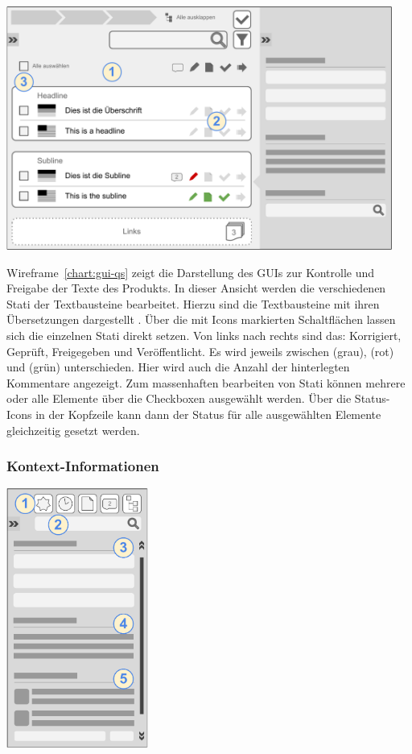 \begin{center}
\includegraphics[width=0.95\textwidth]{media/GUIFreigabe.pdf}
\label{chart:gui-qs}
\end{center}

Wireframe~\ref{chart:gui-qs} zeigt die Darstellung des GUIs zur Kontrolle und Freigabe der Texte des Produkts. In dieser Ansicht werden die verschiedenen Stati der Textbausteine bearbeitet. Hierzu sind die Textbausteine mit ihren Übersetzungen dargestellt . Über die mit Icons markierten Schaltflächen  lassen sich die einzelnen Stati direkt setzen. Von links nach rechts sind das: Korrigiert, Geprüft, Freigegeben und Veröffentlicht. Es wird jeweils zwischen  (grau),  (rot) und  (grün) unterschieden. Hier wird auch die Anzahl der hinterlegten Kommentare angezeigt. Zum massenhaften bearbeiten von Stati können mehrere oder alle Elemente über die Checkboxen  ausgewählt werden. Über die Status-Icons in der Kopfzeile kann dann der Status für alle ausgewählten Elemente gleichzeitig gesetzt werden.

\pagebreak

\subsubsection{Kontext-Informationen}\label{l:gui-kontext}

\begin{center}
\includegraphics[width=0.35\textwidth]{media/GUIKontext-Informationen.pdf}
\label{chart:gui-kontext}
\end{center}

